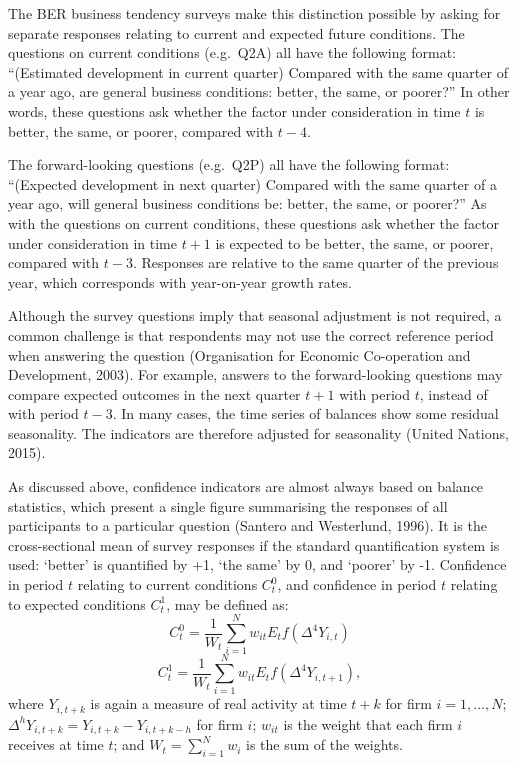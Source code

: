 \documentclass[11pt,]{article}
\begin{document}
The BER business tendency surveys make this distinction possible by
asking for separate responses relating to current and expected future
conditions. The questions on current conditions (e.g.~Q2A) all have the
following format: ``(Estimated development in current quarter) Compared
with the same quarter of a year ago, are general business conditions:
better, the same, or poorer?'' In other words, these questions ask
whether the factor under consideration in time \(t\) is better, the
same, or poorer, compared with \(t-4\).

The forward-looking questions (e.g.~Q2P) all have the following format:
``(Expected development in next quarter) Compared with the same quarter
of a year ago, will general business conditions be: better, the same, or
poorer?'' As with the questions on current conditions, these questions
ask whether the factor under consideration in time \(t+1\) is expected
to be better, the same, or poorer, compared with \(t-3\). Responses are
relative to the same quarter of the previous year, which corresponds
with year-on-year growth rates.

Although the survey questions imply that seasonal adjustment is not
required, a common challenge is that respondents may not use the correct
reference period when answering the question (Organisation for Economic
Co-operation and Development, 2003). For example, answers to the
forward-looking questions may compare expected outcomes in the next
quarter \(t+1\) with period \(t\), instead of with period \(t-3\). In
many cases, the time series of balances show some residual seasonality.
The indicators are therefore adjusted for seasonality (United Nations,
2015).

As discussed above, confidence indicators are almost always based on
balance statistics, which present a single figure summarising the
responses of all participants to a particular question (Santero and
Westerlund, 1996). It is the cross-sectional mean of survey responses if
the standard quantification system is used: `better' is quantified by
+1, `the same' by 0, and `poorer' by -1. Confidence in period \(t\)
relating to current conditions \(C_t^{0}\), and confidence in period
\(t\) relating to expected conditions \(C_t^{1}\), may be defined as:
\[C^{0}_t = \frac{1}{W_t} \sum^N_{i=1} w_{it} E_t f(\Delta^4 Y_{i,t })\]
\[C^{1}_t = \frac{1}{W_t} \sum^N_{i=1} w_{it} E_t f(\Delta^4 Y_{i,t+1}) ,\]
where \(Y_{i,t+k}\) is again a measure of real activity at time \(t+k\)
for firm \(i = 1,...,N\);
\(\Delta^h Y_{i,t+k} = Y_{i,t+k} - Y_{i,t+k-h}\) for firm \(i\);
\(w_{it}\) is the weight that each firm \(i\) receives at time \(t\);
and \(W_{t} = \sum^N_{i=1}w_i\) is the sum of the weights.
\end{document}
